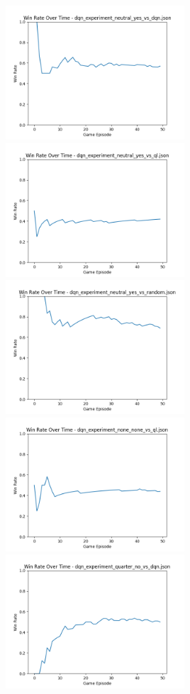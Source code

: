 \includegraphics[width=0.5\textwidth]{images/win_rate_dqn_experiment_neutral_yes_vs_dqn.png} 
\includegraphics[width=0.5\textwidth]{images/win_rate_dqn_experiment_neutral_yes_vs_ql.png} 
\includegraphics[width=0.5\textwidth]{images/win_rate_dqn_experiment_neutral_yes_vs_random.png} 
\includegraphics[width=0.5\textwidth]{images/win_rate_dqn_experiment_none_none_vs_ql.png} 
\includegraphics[width=0.5\textwidth]{images/win_rate_dqn_experiment_quarter_no_vs_dqn.png} 
